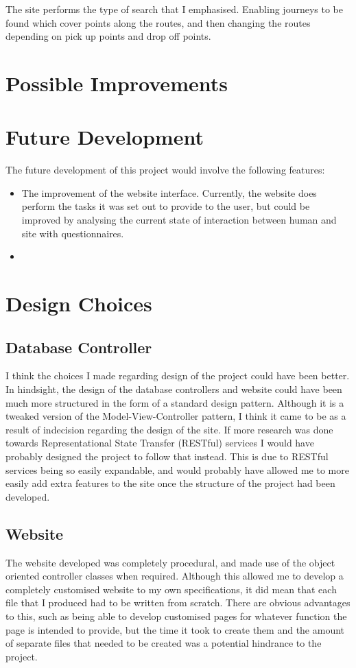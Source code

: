 The site performs the type of search that I emphasised. Enabling journeys to be found which cover points along the routes, and then changing the routes depending on pick up points and drop off points.

\section{Possible Improvements}


\section{Future Development}
The future development of this project would involve the following features:

\begin{itemize}
\item The improvement of the website interface. Currently, the website does perform the tasks it was set out to provide to the user, but could be improved by analysing the current state of interaction between human and site with questionnaires.
\item 
\end{itemize}

\section{Design Choices}
\subsection{Database Controller}
I think the choices I made regarding design of the project could have been better. In hindsight, the design of the database controllers and website could have been much more structured in the form of a standard design pattern. Although it is a tweaked version of the Model-View-Controller pattern, I think it came to be as a result of indecision regarding the design of the site. If more research was done towards Representational State Transfer (RESTful) services I would have probably designed the project to follow that instead. This is due to RESTful services being so easily expandable, and would probably have allowed me to more easily add extra features to the site once the structure of the project had been developed.

\subsection{Website}
The website developed was completely procedural, and made use of the object oriented controller classes when required. Although this allowed me to develop a completely customised website to my own specifications, it did mean that each file that I produced had to be written from scratch. There are obvious advantages to this, such as being able to develop customised pages for whatever function the page is intended to provide, but the time it took to create them and the amount of separate files that needed to be created was a potential hindrance to the project.

